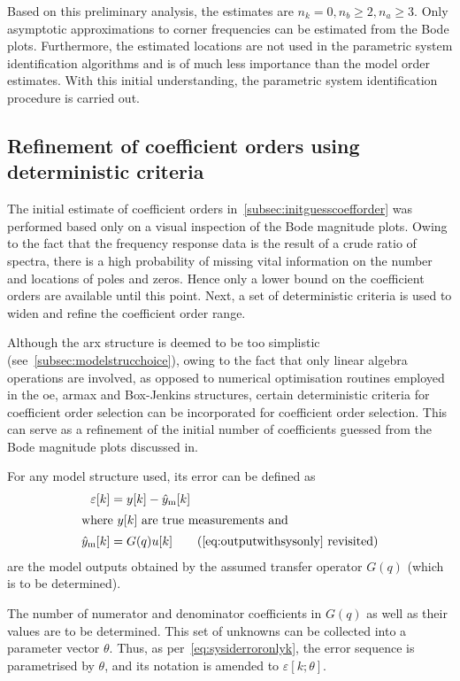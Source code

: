 Based on this preliminary  analysis, the estimates are $n_k = 0,  n_b \ge 2, n_a
\ge 3$.  Only asymptotic approximations  to corner frequencies can  be estimated
from the  Bode plots. Furthermore, the  estimated locations are not  used in the
parametric system identification algorithms and  is of much less importance than
the  model order  estimates.  With this  initial  understanding, the  parametric
system identification procedure is carried out.

\subsection{Refinement of coefficient orders using deterministic criteria}\label{subsec:refinementofcoefforder}

The initial estimate  of coefficient orders in~\cref{subsec:initguesscoefforder}
was performed  based only on  a visual inspection  of the Bode  magnitude plots.
Owing to  the fact that  the frequency  response data is  the result of  a crude
ratio of  spectra, there is a  high probability of missing  vital information on
the number and locations of poles and zeros. Hence only a lower bound on the
coefficient orders are available until this point. Next, a set of deterministic
criteria is used to widen and refine the coefficient order range.


Although   the   \gls{arx}   structure   is  deemed   to   be   too   simplistic
(see~\cref{subsec:modelstrucchoice}), owing to the fact that only linear algebra
operations are involved, as opposed  to numerical optimisation routines employed
in the  \gls{oe}, \gls{armax} and Box-Jenkins  structures, certain deterministic
criteria for  coefficient order  selection can  be incorporated  for coefficient
order selection.
This  can serve  as  a  refinement  of  the
initial number of  coefficients guessed from the Bode  magnitude plots discussed
in.

For any model structure used, its error can be defined as
\begin{align}
    \varepsilon[k]      & = y[k] - \hat{y}_\text{m}[k] \label{eq:sysiderroronlyk}\\
    \shortintertext{where $y[k]$ are true measurements and}
    \hat{y}_\text{m}[k] & = G(q)u[k] \tag{\cref{eq:outputwithsysonly} revisited}
\end{align}
are the model outputs obtained by the assumed transfer operator $G(q)$ (which is
to be determined).

The  number of  numerator  and denominator  coefficients in  $G(q)$  as well  as
their  values are  to  be determined.  This  set of  unknowns  can be  collected
into a  parameter vector  $\theta$. Thus, as  per~\cref{eq:sysiderroronlyk}, the
error  sequence is  parametrised by  $\theta$, and  its notation  is amended  to
$\varepsilon[k;\theta]$.

